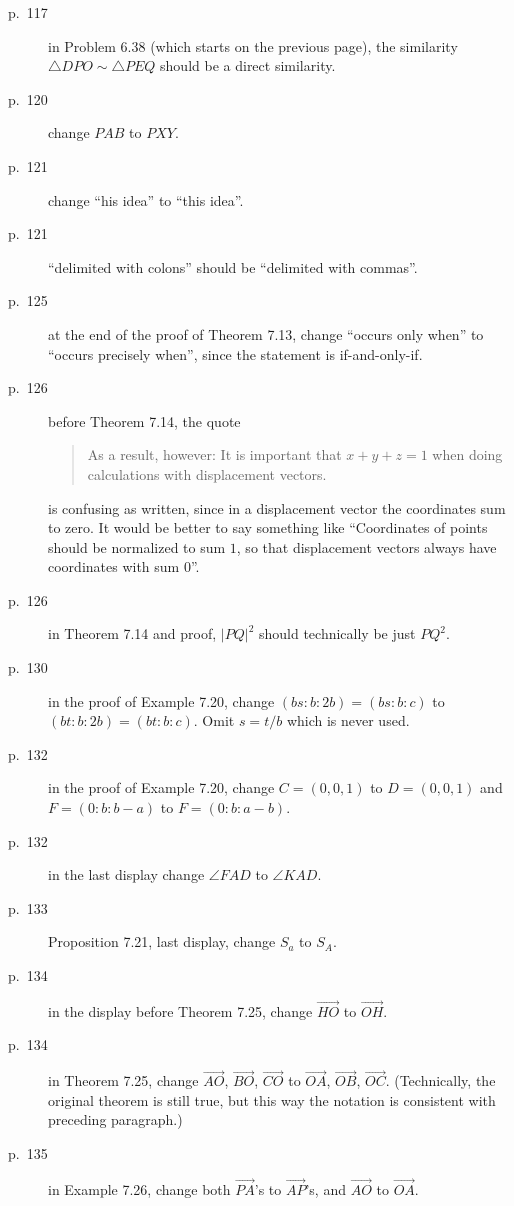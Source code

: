 \documentclass[11pt]{scrartcl}
\begin{document}
\begin{description}
\item[p.\  117] in Problem 6.38 (which starts on the previous page), the similarity
  $\triangle DPO \sim \triangle PEQ$ should be a direct similarity.
\item[p.\  120] change $PAB$ to $PXY$.
\item[p.\  121] change ``his idea'' to ``this idea''.
\item[p.\  121] ``delimited with colons'' should be
  ``delimited with commas''.
\item[p.\  125] at the end of the proof of Theorem 7.13,
  change ``occurs only when'' to ``occurs precisely when'',
  since the statement is if-and-only-if.
\item[p.\  126] before Theorem 7.14, the quote
  \begin{quote}
    As a result, however:
    It is important that $x+y+z=1$ when doing calculations with displacement vectors.
  \end{quote}
  is confusing as written, since in a displacement vector the coordinates sum to zero.
  It would be better to say something like
  ``Coordinates of points should be normalized to sum $1$,
  so that displacement vectors always have coordinates with sum $0$''.
\item[p.\  126] in Theorem 7.14 and proof, $|PQ|^2$ should technically be just $PQ^2$.
\item[p.\  130] in the proof of Example 7.20, change $(bs:b:2b)=(bs:b:c)$ to $(bt:b:2b)=(bt:b:c)$.
  Omit $s=t/b$ which is never used.
\item[p.\  132] in the proof of Example 7.20, change $C = (0, 0, 1)$ to $D = (0, 0, 1)$
  and $F = (0 : b : b - a)$ to $F = (0 : b : a - b)$.
\item[p.\  132] in the last display change $\angle FAD$ to $\angle KAD$.
\item[p.\  133] Proposition 7.21, last display, change $S_a$ to $S_A$.
\item[p.\  134] in the display before Theorem 7.25,
  change $\overrightarrow{HO}$ to $\overrightarrow{OH}$.
\item[p.\  134] in Theorem 7.25, change
  $\overrightarrow{AO}$, $\overrightarrow{BO}$, $\overrightarrow{CO}$ to
  $\overrightarrow{OA}$, $\overrightarrow{OB}$, $\overrightarrow{OC}$.
  (Technically, the original theorem is still true,
  but this way the notation is consistent with preceding paragraph.)
\item[p.\  135] in Example 7.26, change both $\overrightarrow{PA}$'s to $\overrightarrow{AP}$'s,
  and $\overrightarrow{AO}$ to $\overrightarrow{OA}$.

\end{description}
\end{document}
